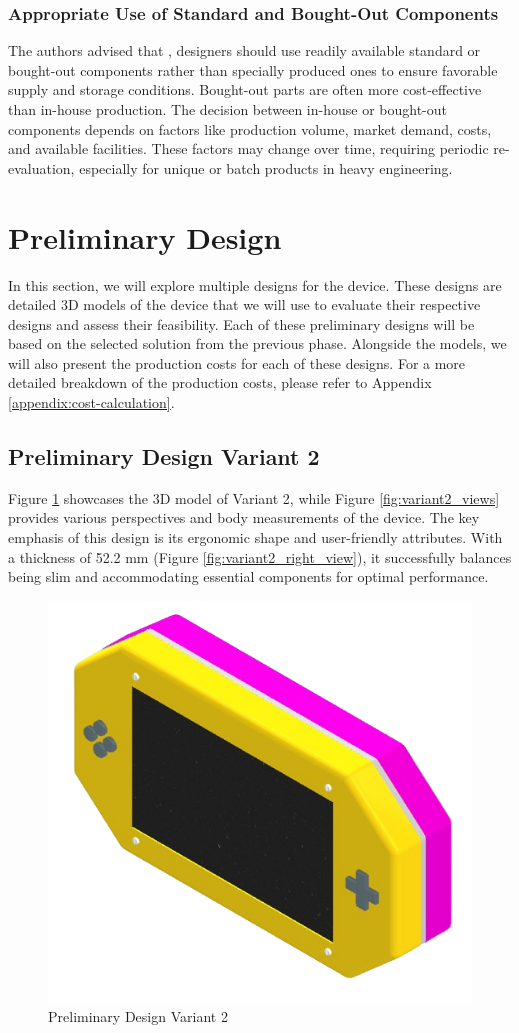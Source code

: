 \subsubsection{Appropriate Use of Standard and Bought-Out Components}
The authors advised that \cite[374-375]{Pahl2007}, designers should use readily available standard or bought-out components rather than specially produced ones to ensure favorable supply and storage conditions. Bought-out parts are often more cost-effective than in-house production. The decision between in-house or bought-out components depends on factors like production volume, market demand, costs, and available facilities. These factors may change over time, requiring periodic re-evaluation, especially for unique or batch products in heavy engineering.

\section{Preliminary Design}
In this section, we will explore multiple designs for the device. These designs are detailed 3D models of the device that we will use to evaluate their respective designs and assess their feasibility. Each of these preliminary designs will be based on the selected solution from the previous phase. Alongside the models, we will also present the production costs for each of these designs. For a more detailed breakdown of the production costs, please refer to Appendix \ref{appendix:cost-calculation}.


\subsection{Preliminary Design Variant 2}
\label{subsec:preliminary_design_variant_2}
Figure \ref{fig:preliminary_design_variant_2} showcases the 3D model of Variant 2, while Figure \ref{fig:variant2_views} provides various perspectives and body measurements of the device. The key emphasis of this design is its ergonomic shape and user-friendly attributes. With a thickness of 52.2 mm (Figure \ref{fig:variant2_right_view}), it successfully balances being slim and accommodating essential components for optimal performance.

\begin{figure}[ht!]
    \centering
    \includegraphics[height=5 cm]{texs/Part1/chapter4/image/v21.png}
    \caption{Preliminary Design Variant 2}
    \label{fig:preliminary_design_variant_2}
\end{figure}

